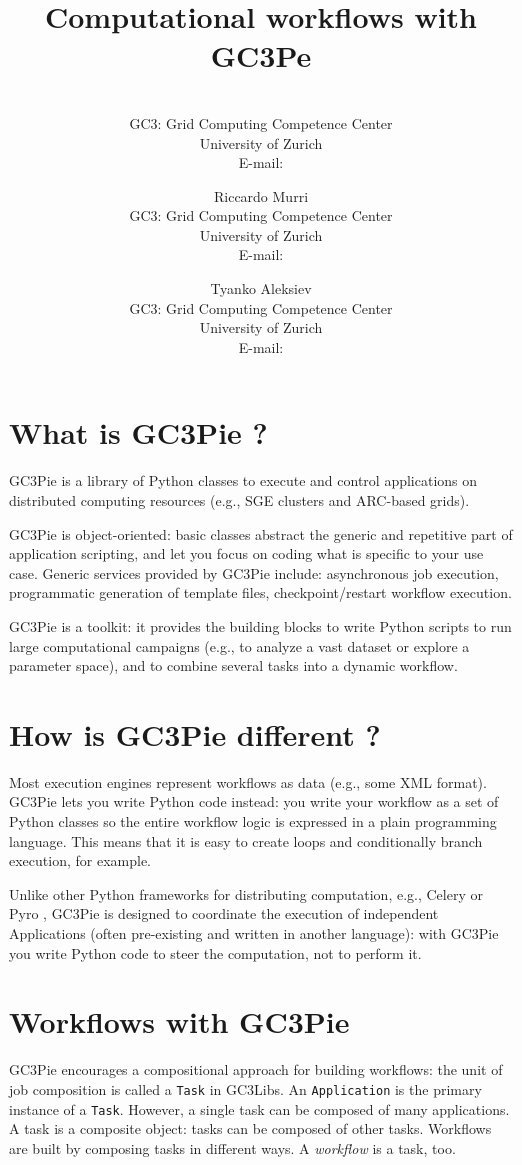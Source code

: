 \documentclass{PoS}
\title{Computational workflows with GC3Pe}
\author{\speaker{Sergio MAFFIOLETTI}\\
        GC3: Grid Computing Competence Center\\
        University of Zurich \\
         E-mail: \email{sergio.maffioletti@gc3.uzh.ch}}
\author{Riccardo Murri\\
        GC3: Grid Computing Competence Center\\
        University of Zurich \\
        E-mail: \email{riccardo.murri@gmail.com}}
\author{Tyanko Aleksiev\\
        GC3: Grid Computing Competence Center\\
        University of Zurich \\
        E-mail: \email{tyanko.aleksiev@gmail.com}}
\begin{document}
\section{What is GC3Pie ?}
GC3Pie is a library of Python classes to execute and control
applications on distributed computing resources (e.g., SGE clusters
and ARC-based grids).
 
GC3Pie is object-oriented: basic classes abstract the generic and
repetitive part of application scripting, and let you focus on coding
what is specific to your use case. Generic services provided by GC3Pie
include: asynchronous job execution, programmatic generation of
template files, checkpoint/restart workflow execution.

GC3Pie is a toolkit: it provides the building blocks to write Python
scripts to run large computational campaigns (e.g., to analyze a vast
dataset or explore a parameter space), and to combine several tasks
into a dynamic workflow.

\section{How is GC3Pie different ?}
Most execution engines represent workflows as data (e.g., some XML
format). GC3Pie lets you write Python code instead: you write your
workflow as a set of Python classes so the entire workflow logic is
expressed in a plain programming language. This means that it is easy
to create loops and conditionally branch execution, for example.
 
Unlike other Python frameworks for distributing computation, e.g.,
Celery \cite{celery} or Pyro \cite{pyro}, GC3Pie is designed to
coordinate the execution of independent Applications (often
pre-existing and written in another language): with GC3Pie you write
Python code to steer the computation, not to perform it. 

\section{Workflows with GC3Pie}
GC3Pie encourages a compositional approach for building workflows: the
unit of job composition is called a \texttt{Task} in GC3Libs. An
\texttt{Application} is the primary instance of a
\texttt{Task}. However, a single task can be composed of many
applications. A task is a composite object: tasks can be composed of
other tasks. Workflows are built by composing tasks in different
ways. A \emph{workflow} is a task, too.
\end{document}
